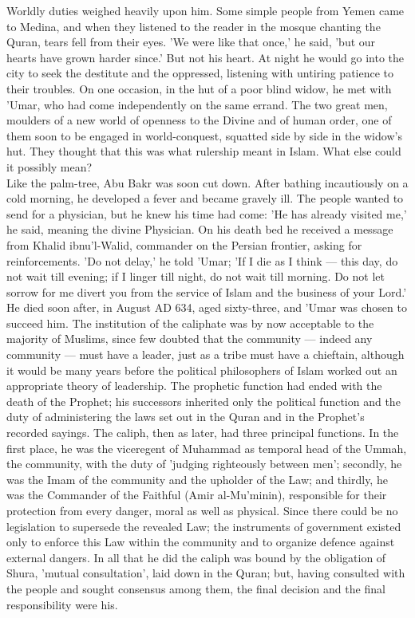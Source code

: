 \documentclass[10pt, twoside]{book}
\begin{document}
Worldly duties weighed heavily upon him. Some simple people from Yemen came to Medina, and when they listened to the reader in the mosque chanting the Quran, tears fell from their eyes. 'We were like that once,' he said, 'but our hearts have grown harder since.' But not his heart. At night he would go into the city to seek the destitute and the oppressed, listening with untiring patience to their troubles. On one occasion, in the hut of a poor blind widow, he met with 'Umar, who had come independently on the same errand. The two great men, moulders of a new world of openness to the Divine and of human order, one of them soon to be engaged in world\hyp{}conquest, squatted side by side in the widow's hut. They thought that this was what rulership meant in Islam. What else could it possibly mean? \\

Like the palm\hyp{}tree, Abu Bakr was soon cut down. After bathing incautiously on a cold morning, he developed a fever and became gravely ill. The people wanted to send for a physician, but he knew his time had come: 'He has already visited me,' he said, meaning the divine Physician. On his death bed he received a message from Khalid ibnu'l\hyp{}Walid, commander on the Persian frontier, asking for reinforcements. 'Do not delay,' he told 'Umar; 'If I die as I think --- this day, do not wait till evening; if I linger till night, do not wait till morning. Do not let sorrow for me divert you from the service of Islam and the business of your Lord.' \\

He died soon after, in August AD 634, aged sixty\hyp{}three, and 'Umar was chosen to succeed him. The institution of the caliphate was by now acceptable to the majority of Muslims, since few doubted that the community --- indeed any community --- must have a leader, just as a tribe must have a chieftain, although it would be many years before the political philosophers of Islam worked out an appropriate theory of leadership. The prophetic function had ended with the death of the Prophet; his successors inherited only the political function and the duty of administering the laws set out in the Quran and in the Prophet's recorded sayings. The caliph, then as later, had three principal functions. In the first place, he was the viceregent of Muhammad as temporal head of the Ummah, the community, with the duty of 'judging righteously between men'; secondly, he was the Imam of the community and the upholder of the Law; and thirdly, he was the Commander of the Faithful (Amir al\hyp{}Mu'minin), responsible for their protection from every danger, moral as well as physical. Since there could be no legislation to supersede the revealed Law; the instruments of government existed only to enforce this Law within the community and to organize defence against external dangers. In all that he did the caliph was bound by the obligation of Shura, 'mutual consultation', laid down in the Quran; but, having consulted with the people and sought consensus among them, the final decision and the final responsibility were his. \\
\end{document}
